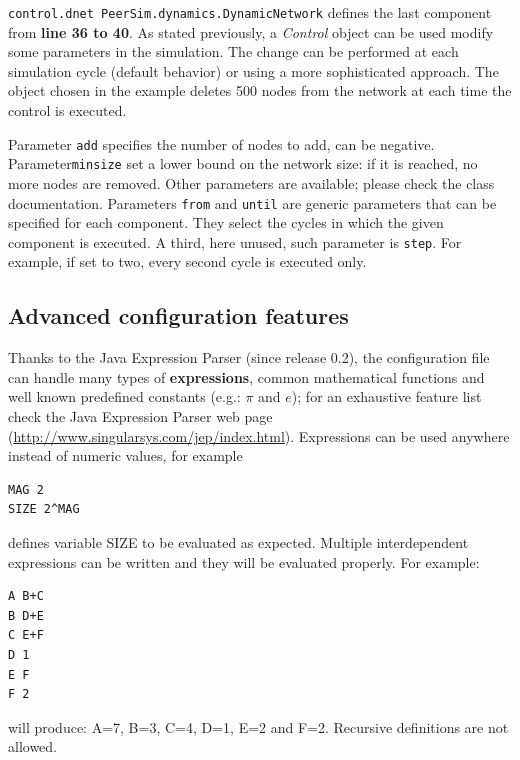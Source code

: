 \documentclass[a4paper,11pt]{article}
\begin{document}
\texttt{control.dnet
PeerSim.dynamics.DynamicNetwork} defines the last component
from \textbf{line 36 to 40}. 
As stated previously, a \emph{Control}
object can be used modify some parameters in the simulation.
The change can be performed at each simulation cycle (default
behavior) or using a more sophisticated approach. The object chosen
in the example deletes 500 nodes from the network at each time
the control is executed.

Parameter \texttt{add} specifies the number of nodes to add, can be negative.
Parameter\texttt{minsize} set a lower bound on the network size: if it is
reached, no more nodes are removed.
Other parameters are available; please check the class documentation.
Parameters \texttt{from} and \texttt{until} are generic parameters that can
be specified for each component.
They select the cycles in which the given component is executed.
A third, here unused, such parameter is \texttt{step}.
For example, if set to two, every second cycle is executed only.

\subsection{Advanced configuration features}

Thanks to the Java Expression Parser (since release
0.2), the configuration
file can handle many types of \textbf{expressions},
common mathematical functions and well known predefined
constants (e.g.: $\pi$ and $e$); for an exhaustive feature list check
the Java Expression Parser web page
(\url{http://www.singularsys.com/jep/index.html}).
Expressions can be used anywhere instead of numeric values, for example
\begin{verbatim}
MAG 2
SIZE 2^MAG
\end{verbatim}
defines variable SIZE to be evaluated as expected.
Multiple interdependent expressions can be written and they will
be evaluated properly. For example:
\begin{verbatim}
A B+C
B D+E
C E+F
D 1
E F
F 2
\end{verbatim}
will produce: A=7, B=3, C=4, D=1, E=2 and F=2.
Recursive definitions are not allowed.
\end{document}
